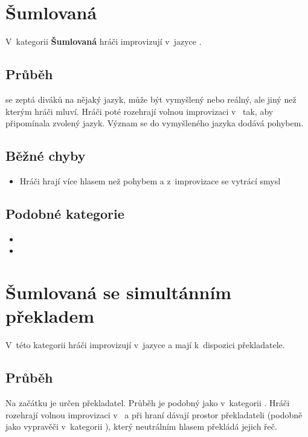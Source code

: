  
\needspace{5cm} \section{Šumlovaná} \label{šumlovaná}  
 
V~kategorii \textbf{Šumlovaná} hráči improvizují v~jazyce . 
 
\subsection{ Průběh }  se zeptá diváků na nějaký jazyk, může být vymyšlený nebo reálný, ale jiný než kterým hráči mluví. Hráči poté rozehrají volnou improvizaci v~ tak, aby připomínala zvolený jazyk. Význam se do vymyšleného jazyka dodává pohybem. 
 
\subsection{ Běžné chyby } \begin{itemize}
\item  Hráči hrají více hlasem než pohybem a z~improvizace se vytrácí smysl
\end{itemize}
 
\subsection{ Podobné kategorie } \begin{itemize}
\item  {}
\item  {}
\end{itemize}
 
 
 
 
\needspace{5cm} \section{Šumlovaná se simultánním překladem} \label{šumlovaná se simultánním překladem}  
 
V~této kategorii hráči improvizují v~jazyce  a mají k~dispozici překladatele. 
 
\subsection{ Průběh } Na začátku je určen překladatel. Průběh je podobný jako v~kategorii . Hráči rozehrají volnou improvizaci v~ a při hraní dávají prostor překladateli (podobně jako vypravěči v~kategorii ), který neutrálním hlasem překládá jejich řeč.  
 
